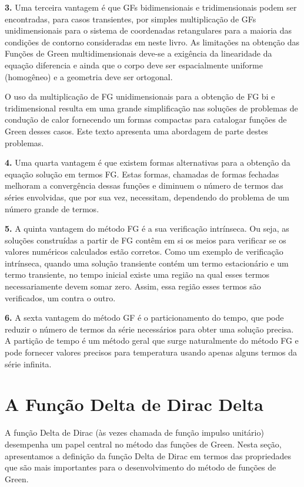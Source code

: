 \textbf{3.} Uma terceira vantagem é que GFs bidimensionais e tridimensionais podem ser encontradas, para casos transientes, por simples multiplicação de GFs unidimensionais para o sistema de coordenadas retangulares para a maioria das condições de contorno consideradas em neste livro.  As limitações na obtenção das Funções de Green multidimensionais deve-se a exigência da linearidade da equação diferencia e ainda que o corpo deve ser espacialmente uniforme (homogêneo) e a geometria deve ser ortogonal.  

O uso da multiplicação de FG unidimensionais para a obtenção de FG bi e tridimensional resulta em uma grande simplificação nas soluções de problemas de condução de calor fornecendo um formas compactas para catalogar funções de Green desses casos. Este texto apresenta uma abordagem de parte destes problemas.

\textbf{4.} Uma quarta vantagem é que existem formas alternativas para a obtenção da equação solução em termos FG. Estas formas, chamadas de formas fechadas melhoram a convergência dessas funções e diminuem o número de termos das séries envolvidas, que por sua vez, necessitam, dependendo do problema de um número grande de termos.

\textbf{5.} A quinta vantagem do método FG é a sua verificação intrínseca. Ou seja, as soluções construídas a partir de FG contêm em si os meios para verificar se os valores numéricos calculados estão corretos. Como um exemplo de verificação intrínseca, quando uma solução transiente contém um termo estacionário e um termo transiente, no tempo inicial existe uma região na qual esses termos necessariamente devem somar zero. Assim, essa região esses termos são verificados, um contra o outro.

\textbf{6.} A sexta vantagem do método GF é o particionamento do tempo, que pode reduzir o número de termos da série necessários para obter uma solução precisa. A partição de tempo é um método geral que surge naturalmente do método FG e pode fornecer valores precisos para temperatura usando apenas alguns termos da série infinita.


\section{A Função Delta de Dirac Delta}

A função Delta de Dirac (às vezes chamada de função impulso unitário) desempenha um papel central no método das funções de Green. Nesta seção, apresentamos a definição da função Delta de Dirac em termos das propriedades que são mais importantes para o desenvolvimento do método de funções de Green.

